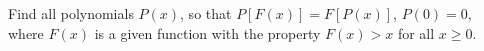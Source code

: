 Find all polynomials $P(x)$, so that $P[F(x)] = F[P(x)]$, $P(0) = 0$, where $F(x)$ is a given function with the property $F(x) > x$ for all $x \geq 0$.
